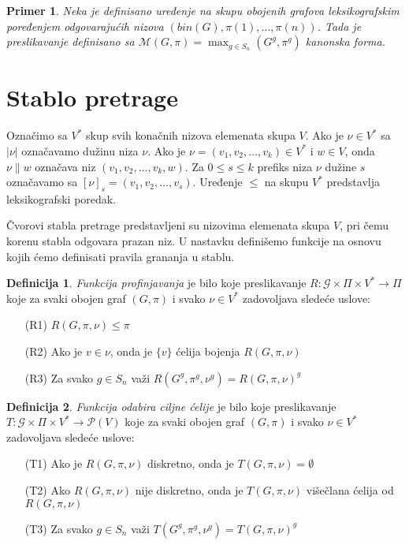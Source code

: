 \documentclass[12pt,oneside]{memoir}
\newtheorem{example}{Primer}
\theoremstyle{definition}
\newtheorem*{definition}{Definicija}
\begin{document}
   \begin{example}
	   Neka je definisano uređenje na skupu obojenih grafova leksikografskim
	   poređenjem odgovarajućih nizova $(bin(G), \pi(1), \dots, \pi(n))$. Tada
	   je preslikavanje definisano sa $\mathcal{M}(G, \pi) = \max_{g \in S_n}
	   (G^g, \pi^g)$ kanonska forma.
   \end{example}


 \section{Stablo pretrage}

  Označimo sa $V^*$ skup svih konačnih nizova elemenata skupa $V$. Ako je $\nu
  \in V^*$ sa $|\nu|$ označavamo dužinu niza $\nu$. Ako je $\nu = (v_1, v_2,
  \dots, v_k) \in V^*$ i $w \in V$, onda $\nu \| w$ označava niz $(v_1, v_2,
  \dots, v_k, w)$. Za $0 \leq s \leq k$ prefiks niza $\nu$ dužine $s$ označavamo
  sa $[\nu]_s = (v_1, v_2, \dots, v_s)$. Uređenje $\leq$ na skupu $V^*$
  predstavlja leksikografski poredak.

  Čvorovi stabla pretrage  predstavljeni su nizovima elemenata skupa $V$, pri
  čemu korenu stabla odgovara prazan niz. U nastavku definišemo funkcije na
  osnovu kojih ćemo definisati pravila grananja u stablu.

  \begin{definition}
   \emph{Funkcija profinjavanja} je bilo koje preslikavanje $R : \mathcal{G}
	  \times \Pi \times V^* \to \Pi$ koje za svaki obojen graf $(G, \pi)$ i
	  svako $\nu \in V^*$ zadovoljava sledeće uslove:
  
   \begin{itemize}
       \item[(R1)] $R(G, \pi, \nu) \leq \pi$
       \item[(R2)] Ako je $v \in \nu$, onda je $\{v\}$ ćelija bojenja $R(G,
     	  \pi, \nu)$
       \item[(R3)] Za svako $g \in S_n$ važi $R(G^g, \pi^g, \nu^g) = R(G,
     	 \pi, \nu)^g$
   \end{itemize}
  \end{definition}

  \begin{definition}
   \emph{Funkcija odabira ciljne ćelije} je bilo koje preslikavanje $T :
	  \mathcal{G} \times \Pi \times V^* \to \mathcal{P}(V)$ koje za svaki
	  obojen graf $(G, \pi)$ i svako $\nu \in V^*$ zadovoljava sledeće
	  uslove:
  
   \begin{itemize}
       \item[(T1)] Ako je $R(G, \pi, \nu)$ diskretno, onda je $T(G, \pi, \nu) =
     	  \emptyset$
       \item[(T2)] Ako $R(G, \pi, \nu)$ nije diskretno, onda je $T(G, \pi, \nu)$
     	  višečlana ćelija od $R(G, \pi, \nu)$
       \item[(T3)] Za svako $g \in S_n$ važi $T(G^g, \pi^g, \nu^g) = T(G, \pi,
     	 \nu)^g$
   \end{itemize}
  \end{definition}
\end{document}

